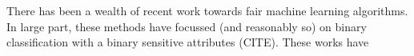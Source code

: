 There has been a wealth of recent work towards fair machine learning algorithms. In large part, these methods have focussed (and reasonably so) on binary classification with a binary sensitive attributes (CITE). These works have 






